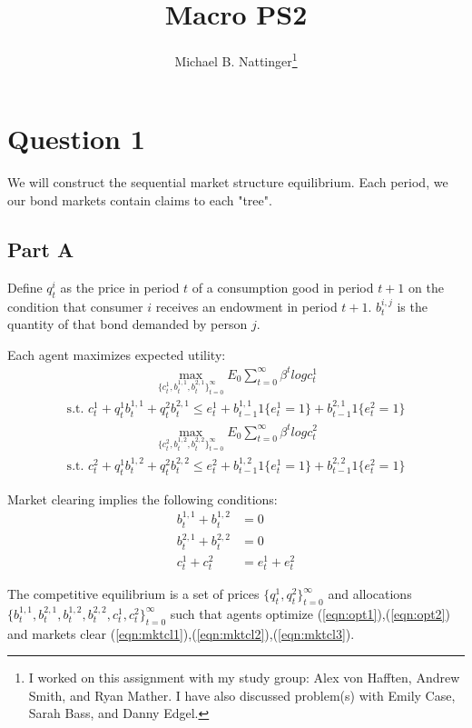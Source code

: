 \documentclass[11pt]{article} %
\title{Macro PS2}
\author{Michael B. Nattinger\footnote{I worked on this assignment with my study group: Alex von Hafften, Andrew Smith, and Ryan Mather. I have also discussed problem(s) with Emily Case, Sarah Bass, and Danny Edgel.}}
\begin{document}
\maketitle
\section{Question 1}
We will construct the sequential market structure equilibrium. Each period, we our bond markets contain claims to each "tree". 
\subsection{Part A}
Define $q_t^i$ as the price in period $t$ of a consumption good in period $t+1$ on the condition that consumer $i$ receives an endowment in period $t+1$. $b_t^{i,j}$ is the quantity of that bond demanded by person $j$.

Each agent maximizes expected utility:
\begin{align}
\max_{\{c_t^1,b_t^{1,1},b_t^{2,1}\}_{t=0}^{\infty}} E_0 \sum_{t=0}^{\infty}\beta^tlog c_t^1 \label{eqn:opt1}
\end{align}
\begin{align*}
\text{s.t. } c_t^1 + q_t^1b_t^{1,1} + q_t^2b_t^{2,1} \leq e_t^1 + b_{t-1}^{1,1}1\{ e_t^1=1 \} +  b_{t-1}^{2,1}1\{ e_t^2=1 \} %
\end{align*}
\begin{align}
\max_{\{c_t^2,b_t^{1,2},b_t^{2,2}\}_{t=0}^{\infty}} E_0 \sum_{t=0}^{\infty}\beta^tlog c_t^2 \label{eqn:opt2} 
\end{align}
\begin{align*}
\text{s.t. } c_t^2 + q_t^1b_t^{1,2} + q_t^2b_t^{2,2} \leq e_t^2 + b_{t-1}^{1,2}1\{ e_t^1=1 \} +  b_{t-1}^{2,2}1\{ e_t^2=1 \} 
\end{align*}

Market clearing implies the following conditions:
\begin{align}
b_t ^{1,1} + b_t^{1,2} &= 0 \label{eqn:mktcl1} \\
b_t ^{2,1} + b_t^{2,2} &= 0 \label{eqn:mktcl2} \\
c_t^1+c_t^2 &= e_t^1 + e_t^2 \label{eqn:mktcl3}
\end{align}

The competitive equilibrium is a set of prices $\{ q_t^1,q_t^2 \}_{t=0}^{\infty}$ and allocations $\{ b_t^{1,1},b_t^{2,1}, b_t^{1,2},b_t^{2,2},c_t^1,c_t^2\}_{t=0}^{\infty}$ such that agents optimize (\ref{eqn:opt1}),(\ref{eqn:opt2}) and markets clear (\ref{eqn:mktcl1}),(\ref{eqn:mktcl2}),(\ref{eqn:mktcl3}).
\end{document}
